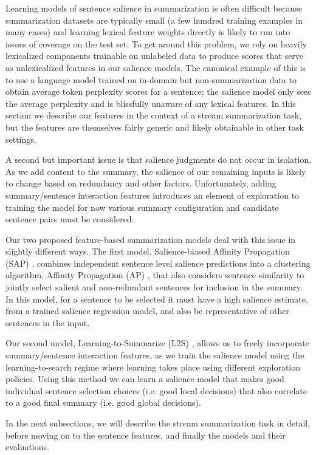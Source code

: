 Learning models of sentence salience in summarization is often difficult
because summarization datasets are typically small (a few hundred training
examples in many cases) and learning lexical 
feature weights directly is likely to run into issues of coverage on the test
set. To get around this problem, we rely on heavily lexicalized components 
trainable on unlabeled data to produce scores that serve as unlexicalized 
features in our salience models. The canonical example of this is to use 
a language model trained on in-domain but non-summarization data to 
obtain average token perplexity scores for a sentence; the salience model
only sees the average perplexity and is blissfully unaware of any lexical 
features. 
In this section we 
describe our features in the context of a stream summarization task, but the 
features are themselves fairly generic and likely obtainable in other task
settings.

A second but important issue is that salience judgments do not occur
in isolation. As we add content to the summary, the salience
of our remaining inputs is likely to change based on redundancy and other 
factors.
Unfortunately, adding summary/sentence interaction features introduces an element of 
exploration to training the model for now various summary configuration 
and candidate sentence pairs must be considered.

Our two proposed feature-based summarization models deal with this
issue in slightly different ways. 
The first model, Salience-biased Affinity Propagation (SAP) 
\citep{kedzie2015predicting}, combines 
independent sentence level salience predictions into a clustering algorithm,
Affinity Propagation (AP) \citep{frey2007clustering}, that also 
considers sentence similarity to jointly select salient and 
non-redundant sentences for inclusion in the summary. In this model, for 
a sentence to be selected it must have a high salience estimate, from a 
trained salience regression model, and also be
representative of other sentences in the input.

Our second model, Learning-to-Summarize (L2S) \citep{kedzie2016real}, allows 
us to freely incorporate summary/sentence interaction
features, as we train the salience model using the learning-to-search regime
\citep{daume2009search,chang2015learning}
where learning takes place using different exploration policies. Using 
this method we can learn a salience model that makes good individual sentence
selection choices (i.e. good local decisions) that also correlate to a good 
final summary (i.e. good global decisions). 

In the next subsections, we will describe the stream summarization task
in detail, before moving on to the sentence features, and finally the models
and their evaluations.


